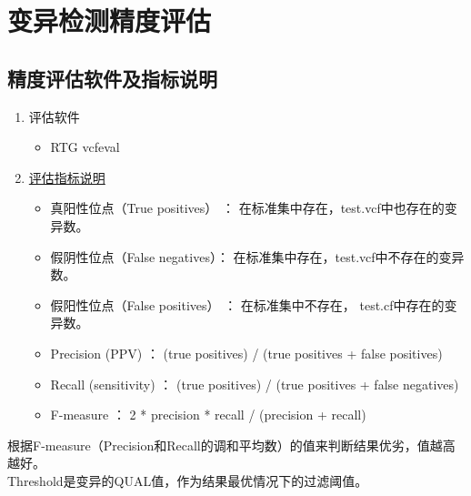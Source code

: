 \documentclass[UTF8,10pt,a4paper]{ctexart}
\begin{document}

\section{变异检测精度评估}
\subsection{精度评估软件及指标说明}
\begin{enumerate}
\item 评估软件
\begin{itemize}
\item RTG vcfeval
\end{itemize}
\item \href{https://note.youdao.com/share/?token=170F71A3F2494D089B29E2AD944A6ECA&gid=12269890}{评估指标说明}
\begin{itemize}
\item 真阳性位点（True positives）  ：  在标准集中存在，test.vcf中也存在的变异数。 
\item 假阴性位点（False negatives）：  在标准集中存在，test.vcf中不存在的变异数。
\item 假阳性位点（False positives） ：  在标准集中不存在， test.cf中存在的变异数。
\item Precision (PPV) 		： (true positives) / (true positives + false positives) 
\item Recall (sensitivity)		： (true positives) / (true positives + false negatives) 
\item F-measure			： 2 * precision * recall / (precision + recall)
\end{itemize}
\end{enumerate}
根据F-measure（Precision和Recall的调和平均数）的值来判断结果优劣，值越高越好。\\
Threshold是变异的QUAL值，作为结果最优情况下的过滤阈值。
\end{document}
